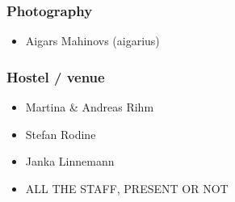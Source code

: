 \documentclass[t]{beamer}
\begin{document}
\begin{frame}
	\frametitle{Photography}
	\begin{itemize}
		\item Aigars Mahinovs (aigarius)
	\end{itemize}
\end{frame}

\begin{frame}
	\frametitle{Hostel / venue}
	\begin{itemize}
		\item Martina \& Andreas Rihm
		\item Stefan Rodine
		\item Janka Linnemann
		\item ALL THE STAFF, PRESENT OR NOT
	\end{itemize}
\end{frame}
\end{document}
